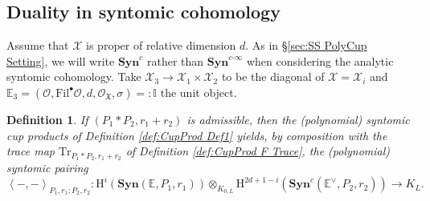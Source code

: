 \documentclass[asterisque,english]{smfart}
\newtheorem{definition}{Definition}[]
\begin{document}
\subsection{Duality in syntomic cohomology}\label{sec:DualSyn}


Assume that $\mathcal{X}$ is proper of relative dimension $d$. As in \S \ref{sec:SS PolyCup Setting}, we will write $\mathbf{Syn}^{c}$ rather
than $\mathbf{Syn}^{c\text{-}\infty }$ when considering the analytic
syntomic cohomology. Take $\mathcal{X}_{3}\rightarrow 
\mathcal{X}_{1}\times \mathcal{X}_{2}$ to be the diagonal of $\mathcal{X}=
\mathcal{X}_{i}$ and  $\mathbb{E}_{3}=\left( \mathcal{O},\mathrm{Fil}
^{\bullet }\mathcal{O},d,\mathcal{O}_{\mathfrak{X}},\sigma \right) =:\mathbb{
I}$ the unit object. 


\begin{definition}
\label{DEF:CupProd Def2} If $\left( P_{1}\ast P_{2},r_{1}+r_{2}\right) $ is
admissible, then the (polynomial) syntomic cup products of Definition \ref{def:CupProd Def1} yields, by composition with the trace map $\mathrm{Tr}
_{P_{1}\ast P_{2},r_{1}+r_{2}}$ of Definition \ref{def:CupProd F Trace}, the (polynomial) syntomic pairing
$$
\left\langle -,-\right\rangle _{P_{1},r_{1};P_{2},r_{2}}\colon \mathrm{H}
^{i}\left( \mathbf{Syn}\left( \mathbb{E},P_1,r_1\right) \right)
\otimes _{K_{0,L}}\mathrm{H}^{2d+1-i}\left( \mathbf{Syn}^{c}
\left( \mathbb{E}^{\vee },P_2,r_2\right) \right) \longrightarrow K_{L}.
$$
\end{definition}
\end{document}
